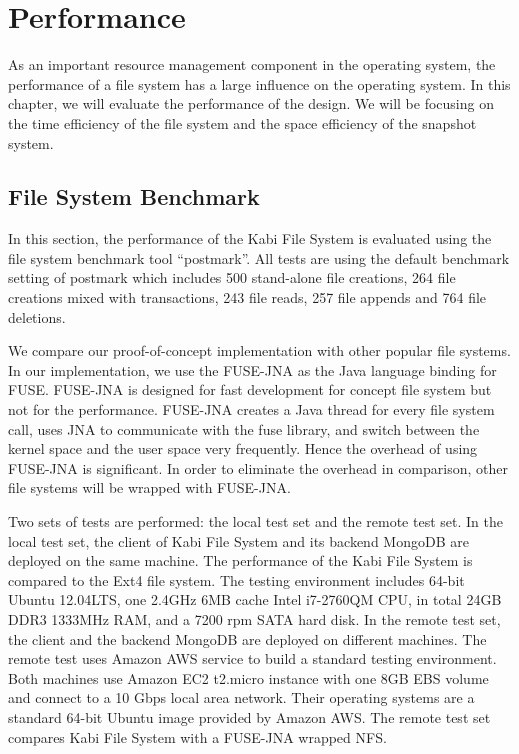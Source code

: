 \chapter{Performance}
\label{chap:perform}

    As an important resource management component in the operating system, the performance of a file system has a large influence on the operating system. In this chapter, we will evaluate the performance of the design. We will be focusing on the time efficiency of the file system and the space efficiency of the snapshot system.

\section{File System Benchmark}

    In this section, the performance of the Kabi File System is evaluated using the file system benchmark tool ``postmark''\cite{postmark}. All tests are using the default benchmark setting of postmark which includes 500 stand-alone file creations, 264 file creations mixed with transactions, 243 file reads, 257 file appends and 764 file deletions.

    We compare our proof-of-concept implementation with other popular file systems. In our implementation, we use the FUSE-JNA\cite{fusejna} as the Java language binding for FUSE. FUSE-JNA is designed for fast development for concept file system but not for the performance. FUSE-JNA creates a Java thread for every file system call, uses JNA to communicate with the fuse library, and switch between the kernel space and the user space very frequently. Hence the overhead of using FUSE-JNA is significant. In order to eliminate the overhead in comparison, other file systems will be wrapped with FUSE-JNA.

    Two sets of tests are performed: the local test set and the remote test set. In the local test set, the client of Kabi File System and its backend MongoDB are deployed on the same machine. The performance of the Kabi File System is compared to the Ext4 file system. The testing environment includes 64-bit Ubuntu 12.04LTS, one 2.4GHz 6MB cache Intel i7-2760QM CPU, in total 24GB DDR3 1333MHz RAM, and a 7200 rpm SATA hard disk. In the remote test set, the client and the backend MongoDB are deployed on different machines. The remote test uses Amazon AWS service to build a standard testing environment. Both machines use Amazon EC2 t2.micro instance with one 8GB EBS volume and connect to a 10 Gbps local area network. Their operating systems are a standard 64-bit Ubuntu image provided by Amazon AWS. The remote test set compares Kabi File System with a FUSE-JNA wrapped NFS. 

